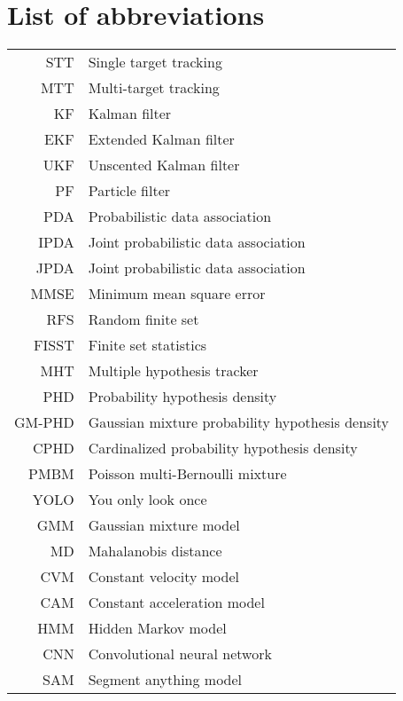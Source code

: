 \documentclass[english,master,unicode,oneside]{ctufit-thesis.c}
\theoremstyle{plain}
\theoremstyle{definition}
\theoremstyle{remark}
\theoremstyle{definition}
\numberwithin{theorem}{chapter}
\begin{document}
\chapter{List of abbreviations}
	
\begin{tabular}{rl}
  STT & Single target tracking \\
MTT & Multi-target tracking \\
KF & Kalman filter \\
EKF & Extended Kalman filter \\
UKF & Unscented Kalman filter \\
PF & Particle filter \\
PDA  & Probabilistic data association \\
IPDA & Joint probabilistic data association\\
JPDA  & Joint probabilistic data association \\
MMSE & Minimum mean square error \\
RFS & Random finite set \\
  FISST & Finite set statistics \\
MHT &   Multiple hypothesis tracker \\
PHD & Probability hypothesis density \\
  GM-PHD & Gaussian mixture probability hypothesis density \\
CPHD & Cardinalized probability hypothesis density \\
PMBM & Poisson multi-Bernoulli mixture \\
YOLO & You only look once \\
GMM & Gaussian mixture model \\
  MD & Mahalanobis distance \\
CVM & Constant velocity model \\
CAM & Constant acceleration model \\
HMM & Hidden Markov model \\
  CNN & Convolutional neural network \\
  SAM & Segment anything model \\
\end{tabular}

\mainmatter\mainmatterinit %
\end{document}
